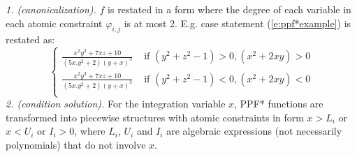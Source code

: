 \documentclass[]{article}
\newcommand{\case}[2]{#2 &\text{ if } #1}%
\newcommand{\otherwise}[1]{#1 &\text{ otherwise}}
\newcommand{\dd}{\;\mathrm{d}} %
\begin{document}
\emph{1. (canonicalization).} $f$ is restated in a form where
the degree of each variable in each atomic constraint $\varphi_{i,j}$ is at most 2.
E.g. case statement (\ref{e:ppf*example}) is restated as:
\begin{equation}
\begin{cases}
\case{(y^2+z^2 -1)>0, (x^2+2xy)>0}{\frac{x^2 y^3 + 7xz + 10}{(5x.y^2 + 2)(y + x)^3}}\\
\case{(y^2+z^2 -1)<0, (x^2+2xy)<0}{\frac{x^2 y^3 + 7xz + 10}{(5x.y^2 + 2)(y + x)^3}}\\
\end{cases}
\end{equation}
\emph{2. (condition solution).} For the integration variable $x$, PPF* functions are transformed into piecewise structures 
with atomic constraints in form $x>L_i$ or $x<U_i$ or $I_i>0$, 
where $L_i$, $U_i$ and $I_i$ are 
algebraic expressions (not necessarily polynomials) that do not involve $x$. 
\end{document}

